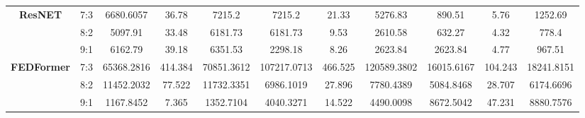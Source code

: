 \documentclass[conference]{IEEEtran}
\begin{document}
\begin{enumerate}
\begin{table}
\begin{adjustbox}{center=\textwidth}
\begin{tabular}{|c|c|c|c|c|c|c|c|c|c|c|}
        \multirow{3}{*}{\textbf{ResNET}} 
            & 7:3 & 6680.6057 & 36.78 & 7215.2 & 7215.2 & 21.33 & 5276.83 & 890.51 & 5.76 & 1252.69 \\
            & 8:2 & 5097.91 & 33.48 & 6181.73 & 6181.73 & 9.53 & 2610.58 & 632.27 & 4.32 & 778.4 \\
            & 9:1 & 6162.79 & 39.18 & 6351.53 & 2298.18 & 8.26 & 2623.84 & 2623.84 & 4.77 & 967.51 \\ \hline
        \multirow{3}{*}{\textbf{FEDFormer}} 
            & 7:3 & 65368.2816 & 414.384 & 70851.3612 & 107217.0713 & 466.525 & 120589.3802 & 16015.6167 & 104.243 & 18241.8151 \\
            & 8:2 & 11452.2032 & 77.522 & 11732.3351 & 6986.1019 & 27.896 & 7780.4389 & 5084.8468 & 28.707 & 6174.6696 \\
            & 9:1 & 1167.8452 & 7.365 & 1352.7104 & 4040.3271 & 14.522 & 4490.0098 & 8672.5042 & 47.231 & 8880.7576 \\ \hline
    \end{tabular}
    \end{adjustbox}
\end{table}





\end{enumerate}
\end{document}
